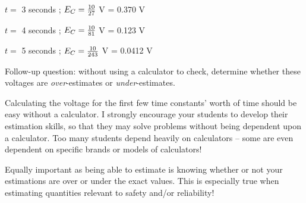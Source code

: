 \vskip 5pt

\item{} $t =$ 3 seconds ; $E_C = {10 \over 27}$ V = 0.370 V

\vskip 5pt

\item{} $t =$ 4 seconds ; $E_C = {10 \over 81}$ V = 0.123 V

\vskip 5pt

\item{} $t =$ 5 seconds ; $E_C = {10 \over 243}$ V = 0.0412 V

\vskip 10pt

Follow-up question: without using a calculator to check, determine whether these voltages are {\it over}-estimates or {\it under}-estimates.







Calculating the voltage for the first few time constants' worth of time should be easy without a calculator.  I strongly encourage your students to develop their estimation skills, so that they may solve problems without being dependent upon a calculator.  Too many students depend heavily on calculators -- some are even dependent on specific brands or models of calculators!

Equally important as being able to estimate is knowing whether or not your estimations are over or under the exact values.  This is especially true when estimating quantities relevant to safety and/or reliability!




